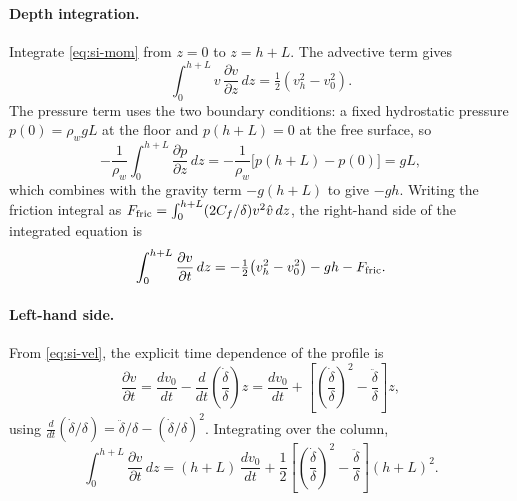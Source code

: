 \documentclass[draft,jgrga]{agutexSI2019}
\begin{document}
\begin{article}
\paragraph{Depth integration.}
Integrate \eqref{eq:si-mom} from $z=0$ to $z=h+L$. The advective term gives
\begin{equation}
    \int_0^{h+L} v\,\frac{\partial v}{\partial z}\,dz
    = \tfrac12\!\left(v_h^2 - v_0^2\right).
\end{equation}
The pressure term uses the two boundary conditions: a fixed hydrostatic pressure
$p(0)=\rho_w g L$ at the floor and $p(h+L)=0$ at the free surface, so
\begin{equation}
    -\frac{1}{\rho_w}\int_0^{h+L}\frac{\partial p}{\partial z}\,dz
    = -\frac{1}{\rho_w}\big[p(h+L)-p(0)\big] = gL,
\end{equation}
which combines with the gravity term $-g(h+L)$ to give $-gh$. Writing the
friction integral as $F_{\rm fric}=\int_0^{h+L}(2C_f/\delta)v^2\hat v\,dz$, the
right-hand side of the integrated equation is
\begin{equation}
    \int_0^{h+L}\frac{\partial v}{\partial t}\,dz
    = -\tfrac12\!\left(v_h^2-v_0^2\right) - gh - F_{\rm fric}.
    \label{eq:si-rhs}
\end{equation}

\paragraph{Left-hand side.}
From \eqref{eq:si-vel}, the explicit time dependence of the profile is
\begin{equation}
    \frac{\partial v}{\partial t}
    = \frac{dv_0}{dt}
      - \frac{d}{dt}\!\left(\frac{\dot\delta}{\delta}\right) z
    = \frac{dv_0}{dt}
      + \left[\left(\frac{\dot\delta}{\delta}\right)^{\!2} - \frac{\ddot\delta}{\delta}\right] z ,
\end{equation}
using $\tfrac{d}{dt}(\dot\delta/\delta)=\ddot\delta/\delta-(\dot\delta/\delta)^2$.
Integrating over the column,
\begin{equation}
    \int_0^{h+L}\frac{\partial v}{\partial t}\,dz
    = (h+L)\,\frac{dv_0}{dt}
      + \frac12\left[\left(\frac{\dot\delta}{\delta}\right)^{\!2} - \frac{\ddot\delta}{\delta}\right](h+L)^2 .
    \label{eq:si-lhs}
\end{equation}


\end{article}
\end{document}
